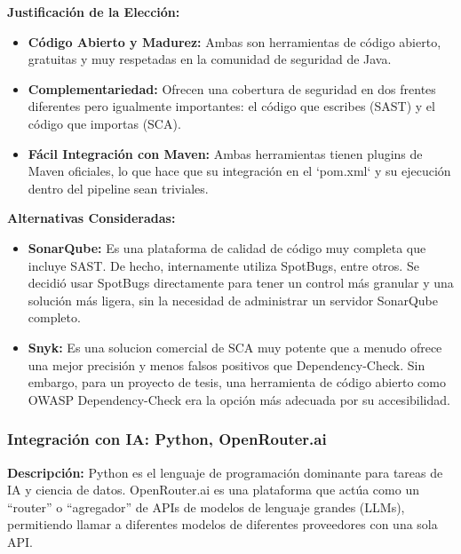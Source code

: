 \textbf{Justificación de la Elección:}
\begin{itemize}
    \item \textbf{Código Abierto y Madurez:} Ambas son herramientas de código abierto, gratuitas y muy respetadas en la comunidad de seguridad de Java.
    \item \textbf{Complementariedad:} Ofrecen una cobertura de seguridad en dos frentes diferentes pero igualmente importantes: el código que escribes (SAST) y el código que importas (SCA).
    \item \textbf{Fácil Integración con Maven:} Ambas herramientas tienen plugins de Maven oficiales, lo que hace que su integración en el `pom.xml` y su ejecución dentro del pipeline sean triviales.
\end{itemize}
\textbf{Alternativas Consideradas:}
\begin{itemize}
    \item \textbf{SonarQube:} Es una plataforma de calidad de código muy completa que incluye SAST. De hecho, internamente utiliza SpotBugs, entre otros. Se decidió usar SpotBugs directamente para tener un control más granular y una solución más ligera, sin la necesidad de administrar un servidor SonarQube completo.
    \item \textbf{Snyk:} Es una solucion comercial de SCA muy potente que a menudo ofrece una mejor precisión y menos falsos positivos que Dependency-Check. Sin embargo, para un proyecto de tesis, una herramienta de código abierto como OWASP Dependency-Check era la opción más adecuada por su accesibilidad.
\end{itemize}

\subsubsection{Integración con IA: Python, OpenRouter.ai}
\textbf{Descripción:} Python es el lenguaje de programación dominante para tareas de IA y ciencia de datos. OpenRouter.ai es una plataforma que actúa como un ``router'' o ``agregador'' de APIs de modelos de lenguaje grandes (LLMs), permitiendo llamar a diferentes modelos de diferentes proveedores con una sola API.

